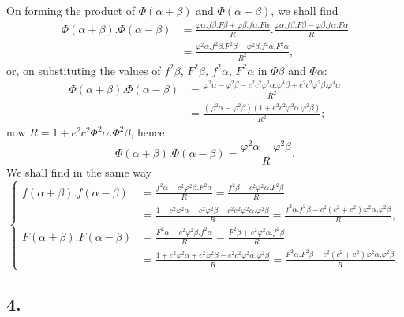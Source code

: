 \documentclass{article}
\begin{document}
On forming the product of $\Phi(\alpha+\beta)$ and $\Phi(\alpha-\beta)$, we shall find
\[ \begin{aligned} \Phi(\alpha+\beta).\Phi(\alpha-\beta)&=\frac{\varphi\alpha.f\beta.F\beta+\varphi\beta.f\alpha.F\alpha}{R}.\frac{\varphi\alpha.f\beta.F\beta-\varphi\beta.f\alpha.F\alpha}{R}\\ &=\frac{\varphi^{2}\alpha.f^{2}\beta.F^{2}\beta-\varphi^{2}\beta.f^{2}\alpha.F^{2}\alpha}{R^{2}}, \end{aligned} \]
or, on substituting the values of $f^{2}\beta$, $F^{2}\beta$, $f^{2}\alpha$, $F^{2}\alpha$ in $\Phi\beta$ and $\Phi\alpha$:
\[ \begin{aligned} \Phi(\alpha+\beta).\Phi(\alpha-\beta)&=\frac{\varphi^{2}\alpha-\varphi^{2}\beta-e^{2}c^{2}\varphi^{2}\alpha.\varphi^{4}\beta+e^{2}c^{2}\varphi^{2}\beta.\varphi^{4}\alpha}{R^{2}}\\ &=\frac{(\varphi^{2}\alpha-\varphi^{2}\beta)(1+e^{2}c^{2}\varphi^{2}\alpha.\varphi^{2}\beta)}{R^{2}}; \end{aligned} \]
now $R=1+e^{2}c^{2}\Phi^{2}\alpha.\Phi^{2}\beta$, hence
\[ \Phi(\alpha+\beta).\Phi(\alpha-\beta)=\frac{\varphi^{2}\alpha-\varphi^{2}\beta}{R}. \tag{13.} \]
We shall find in the same way
\[ \left\{\begin{aligned} f(\alpha+\beta).f(\alpha-\beta)&=\frac{f^{2}\alpha-c^{2}\varphi^{2}\beta.F^{2}\alpha}{R}=\frac{f^{2}\beta-c^{2}\varphi^{2}\alpha.F^{2}\beta}{R}\\ &=\frac{1-c^{2}\varphi^{2}\alpha-c^{2}\varphi^{2}\beta-c^{2}e^{2}\varphi^{2}\alpha.\varphi^{2}\beta}{R}=\frac{f^{2}\alpha.f^{2}\beta-c^{2}(c^{2}+e^{2})\varphi^{2}\alpha.\varphi^{2}\beta}{R},\\ F(\alpha+\beta).F(\alpha-\beta)&=\frac{F^{2}\alpha+e^{2}\varphi^{2}\beta.f^{2}\alpha}{R}=\frac{F^{2}\beta+e^{2}\varphi^{2}\alpha.f^{2}\beta}{R}\\ &=\frac{1+e^{2}\varphi^{2}\alpha+e^{2}\varphi^{2}\beta-e^{2}c^{2}\varphi^{2}\alpha.\varphi^{2}\beta}{R}=\frac{F^{2}\alpha.F^{2}\beta-e^{2}(c^{2}+e^{2})\varphi^{2}\alpha.\varphi^{2}\beta}{R}. \end{aligned}\right. \tag{14.} \]


\subsection*{4.}
\end{document}
